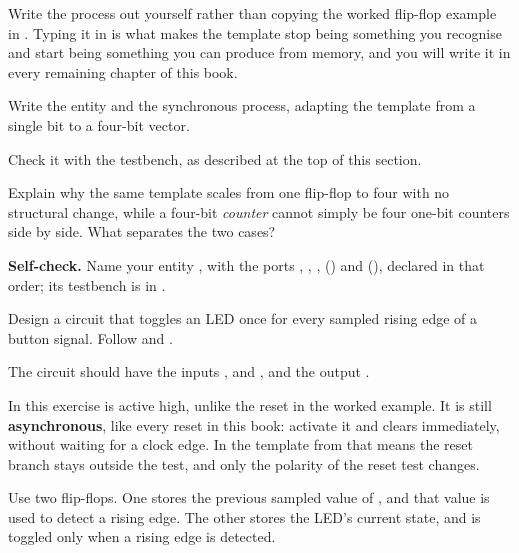 Write the process out yourself rather than copying the worked flip-flop example in
. Typing it in is what makes the template stop being something you recognise
and start being something you can produce from memory, and you will write it in every remaining
chapter of this book.

 Write the entity and the synchronous process, adapting the template from a single bit to
a four-bit vector.

 Check it with the testbench, as described at the top of this section.

 Explain why the same template scales from one flip-flop to four with no structural
change, while a four-bit \emph{counter} cannot simply be four one-bit counters side by side. What
separates the two cases?


\begin{selfcheck}
\textbf{Self-check.} Name your entity , with the ports ,
, ,  () and 
(), declared in that order; its testbench is in
.
\end{selfcheck}


\label{c3:ex:edgehand}
Design a circuit that toggles an LED once for every sampled rising edge of a button signal. Follow
 and .

The circuit should have the inputs ,  and , and the output
.

In this exercise  is active high, unlike the reset in the worked example. It is still
\textbf{asynchronous}, like every reset in this book: activate it and  clears
immediately, without waiting for a clock edge. In the template from  that
means the reset branch stays outside the  test, and only the polarity of
the reset test changes.

Use two flip-flops. One stores the previous sampled value of , and that value is used
to detect a rising edge. The other stores the LED's current state, and is toggled only when a
rising edge is detected.

